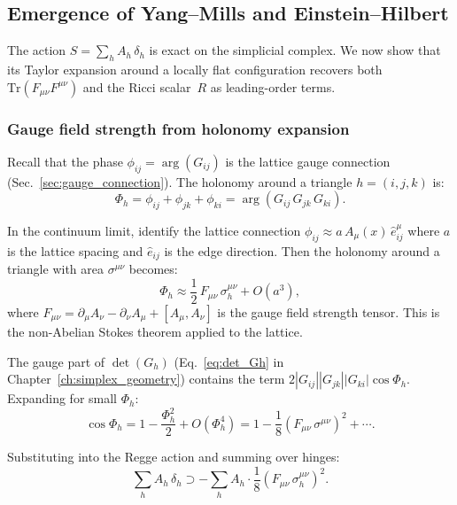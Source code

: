 \subsection{Emergence of Yang--Mills and Einstein--Hilbert}
\label{sec:emergence_YM_EH}

The action $S = \sum_h A_h\,\delta_h$ is exact on the simplicial complex.  We now show that its Taylor expansion around a locally flat configuration recovers both $\text{Tr}(F_{\mu\nu}F^{\mu\nu})$ and the Ricci scalar~$R$ as leading-order terms.

\subsubsection{Gauge field strength from holonomy expansion}

Recall that the phase $\phi_{ij} = \arg(G_{ij})$ is the lattice gauge connection (Sec.~\ref{sec:gauge_connection}).  The holonomy around a triangle $h = (i,j,k)$ is:
\begin{equation}
\Phi_h = \phi_{ij} + \phi_{jk} + \phi_{ki} = \arg(G_{ij}\,G_{jk}\,G_{ki}).
\end{equation}

In the continuum limit, identify the lattice connection $\phi_{ij} \approx a\,A_\mu(x)\,\hat{e}^\mu_{ij}$ where $a$ is the lattice spacing and $\hat{e}_{ij}$ is the edge direction.  Then the holonomy around a triangle with area $\sigma^{\mu\nu}$ becomes:
\begin{equation}
\Phi_h \approx \frac{1}{2}\,F_{\mu\nu}\,\sigma^{\mu\nu}_h + O(a^3),
\end{equation}
where $F_{\mu\nu} = \partial_\mu A_\nu - \partial_\nu A_\mu + [A_\mu, A_\nu]$ is the gauge field strength tensor.  This is the non-Abelian Stokes theorem applied to the lattice.

The gauge part of $\det(G_h)$ (Eq.~\ref{eq:det_Gh} in Chapter~\ref{ch:simplex_geometry}) contains the term $2|G_{ij}||G_{jk}||G_{ki}|\cos\Phi_h$.  Expanding for small $\Phi_h$:
\begin{equation}
\cos\Phi_h = 1 - \frac{\Phi_h^2}{2} + O(\Phi_h^4) = 1 - \frac{1}{8}(F_{\mu\nu}\,\sigma^{\mu\nu})^2 + \cdots.
\end{equation}

Substituting into the Regge action and summing over hinges:
\begin{equation}
\sum_h A_h\,\delta_h \supset -\sum_h A_h \cdot \frac{1}{8}(F_{\mu\nu}\,\sigma^{\mu\nu}_h)^2.
\end{equation}

